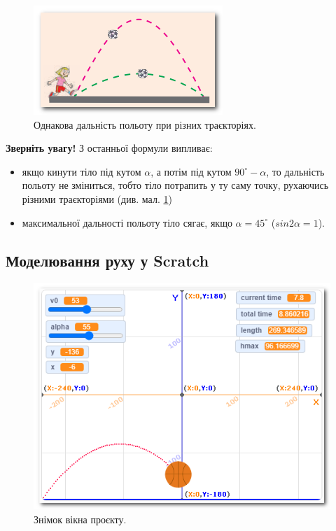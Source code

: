 \begin{figure}[h]
	\centering
	\includegraphics[width=0.6\linewidth]{./images-miziuk/hit3.png}
	\caption{
		\centering
		Однакова дальність польоту при різних траєкторіях.}
	\label{fig:hit3}
\end{figure}

\textbf{Зверніть увагу!} З останньої формули випливає:

\begin{itemize}
	\item якщо кинути тіло під кутом $\alpha$, а потім під кутом $90^{\circ} - \alpha$, то дальність польоту не зміниться, тобто тіло потрапить у ту саму точку, рухаючись різними траєкторіями (див. мал. \ref{fig:hit3})
	\item максимальної дальності польоту тіло сягає, якщо $\alpha = 45^{\circ}$ ($sin2\alpha = 1$).
\end{itemize}

\subsection{Моделювання руху у Scratch}

\begin{figure}[h]
	\centering
	\includegraphics[width=1\linewidth]{./images-miziuk/hit4.png}
	\caption{
		\centering
		Знімок вікна проєкту.}
	\label{fig:hit4}
\end{figure}

